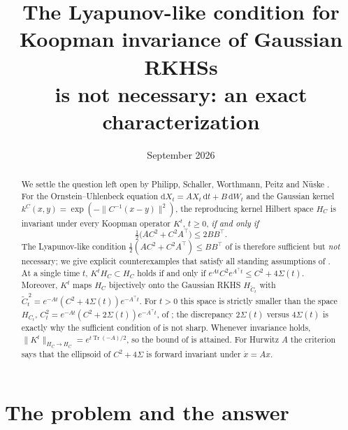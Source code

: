 \documentclass[11pt]{article}
\title{The Lyapunov-like condition for Koopman invariance of Gaussian RKHSs\\
is not necessary: an exact characterization}
\author{}
\date{September 2026}
\theoremstyle{definition}
\theoremstyle{remark}
\newcommand{\Tr}{\operatorname{Tr}}
\newcommand{\tp}{\top}
\begin{document}
\maketitle

\begin{abstract}
We settle the question left open by Philipp, Schaller, Worthmann, Peitz and N\"uske \cite{PSWPN}.
For the Ornstein--Uhlenbeck equation $\mathrm{d}X_t=AX_t\,\mathrm{d}t+B\,\mathrm{d}W_t$ and the Gaussian
kernel $k^C(x,y)=\exp(-\|C^{-1}(x-y)\|^2)$, the reproducing kernel Hilbert space $H_C$ is invariant under
every Koopman operator $K^t$, $t\ge 0$, \emph{if and only if}
\[
\tfrac12\bigl(AC^2+C^2A^\tp\bigr)\le 2BB^\tp .
\]
The Lyapunov-like condition $\tfrac12(AC^2+C^2A^\tp)\le BB^\tp$ of \cite[Theorem~2.1]{PSWPN} is therefore
sufficient but \emph{not} necessary; we give explicit counterexamples that satisfy all standing assumptions
of \cite{PSWPN}. At a single time $t$, $K^tH_C\subset H_C$ holds if and only if
$e^{At}C^2e^{A^\tp t}\le C^2+4\Sigma(t)$. Moreover, $K^t$ maps $H_C$ bijectively onto the Gaussian RKHS
$H_{\widetilde C_t}$ with $\widetilde C_t^{\,2}=e^{-At}(C^2+4\Sigma(t))e^{-A^\tp t}$. For $t>0$ this space is strictly
smaller than the space $H_{C_t}$, $C_t^2=e^{-At}(C^2+2\Sigma(t))e^{-A^\tp t}$, of \cite[Proposition~4.1]{PSWPN}; the discrepancy
$2\Sigma(t)$ versus $4\Sigma(t)$ is exactly why the sufficient condition of \cite{PSWPN} is not sharp. Whenever invariance holds,
$\|K^t\|_{H_C\to H_C}=e^{t\Tr(-A)/2}$, so the bound of \cite[Theorem~2.1]{PSWPN} is attained. For Hurwitz
$A$ the criterion says that the ellipsoid of $C^2+4\Sigma$ is forward invariant under $\dot x=Ax$.
\end{abstract}

\tableofcontents

\section{The problem and the answer}\label{sec:problem}
\end{document}
